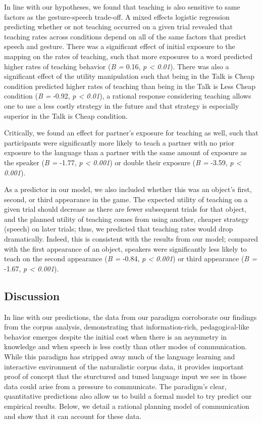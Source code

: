 \documentclass[10pt, letterpaper]{article}
\begin{document}
In line with our hypotheses, we found that teaching is also sensitive to
same factors as the gesture-speech trade-off. A mixed effects logistic
regression predicting whether or not teaching occurred on a given trial
revealed that teaching rates across conditions depend on all of the same
factors that predict speech and gesture. There was a significant effect
of initial exposure to the mapping on the rates of teaching, such that
more exposures to a word predicted higher rates of teaching behavior
(\emph{B =} 0.16, \emph{p \textless{} 0.01}). There was also a
significant effect of the utility manipulation such that being in the
Talk is Cheap condition predicted higher rates of teaching than being in
the Talk is Less Cheap condition (\emph{B =} -0.92, \emph{p \textless{}
0.01}), a rational response considering teaching allows one to use a
less costly strategy in the future and that strategy is especially
superior in the Talk is Cheap condition.

Critically, we found an effect for partner's exposure for teaching as
well, such that participants were significantly more likely to teach a
partner with no prior exposure to the language than a partner with the
same amount of exposure as the speaker (\emph{B =} -1.77, \emph{p
\textless{} 0.001}) or double their exposure (\emph{B =} -3.59, \emph{p
\textless{} 0.001}).

As a predictor in our model, we also included whether this was an
object's first, second, or third appearance in the game. The expected
utility of teaching on a given trial should decrease as there are fewer
subsequent trials for that object, and the planned utility of teaching
comes from using another, cheaper strategy (speech) on later trials;
thus, we predicted that teaching rates would drop dramatically. Indeed,
this is consistent with the results from our model; compared with the
first appearance of an object, speakers were significantly less likely
to teach on the second appearance (\emph{B =} -0.84, \emph{p \textless{}
0.001}) or third appearance (\emph{B =} -1.67, \emph{p \textless{}
0.001}).

\subsection{Discussion}\label{discussion-1}

In line with our predictions, the data from our paradigm corroborate our
findings from the corpus analysis, demonstrating that information-rich,
pedagogical-like behavior emerges despite the initial cost when there is
an asymmetry in knowledge and when speech is less costly than other
modes of communication. While this paradigm has stripped away much of
the language learning and interactive environment of the naturalistic
corpus data, it provides important proof of concept that the sturctured
and tuned language input we see in those data could arise from a
pressure to communicate. The paradigm's clear, quantitative predictions
also allow us to build a formal model to try predict our empirical
results. Below, we detail a rational planning model of communication and
show that it can account for these data.
\end{document}

